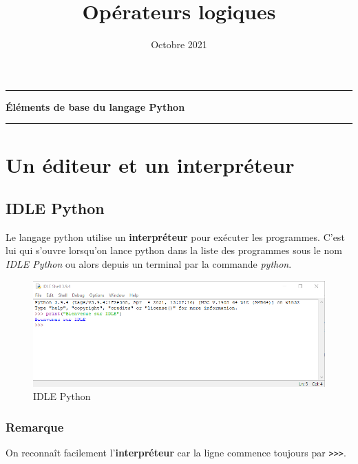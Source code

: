 \documentclass[11pt]{article}
\title{Opérateurs logiques}
\date{Octobre 2021}
\makeatletter
\renewcommand\maketitle[1]{
\hrule\medskip
{\raggedright %
\begin{center}
{\Huge \bfseries \sffamily #1 }\\[4ex] 
\hrule \bigskip
\end{center}}} %
\makeatother
\begin{document}
    
    \maketitle{Éléments de base du langage Python}
    

%    

    \hypertarget{un-uxe9diteur-et-un-interpruxe9teur}{%
\section{Un éditeur et un
interpréteur}\label{un-uxe9diteur-et-un-interpruxe9teur}}

\hypertarget{idle-python}{%
\subsection{IDLE Python}\label{idle-python}}

Le langage python utilise un \textbf{interpréteur} pour exécuter les
programmes. C'est lui qui s'ouvre lorsqu'on lance python dans la liste
des programmes sous le nom \emph{IDLE Python} ou alors depuis un
terminal par la commande \emph{python}.

\begin{figure}
\centering
\includegraphics{img/idle_python.png}
\caption{IDLE Python}
\end{figure}

\hypertarget{remarque}{%
\subsubsection*{Remarque}\label{remarque}}

On reconnaît facilement l'\textbf{interpréteur} car la ligne commence
toujours par \texttt{\textgreater{}\textgreater{}\textgreater{}}.
\end{document}
